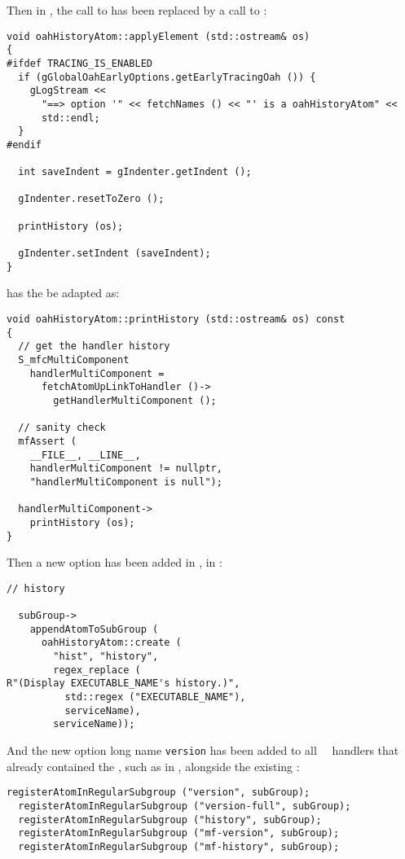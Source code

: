Then in , the call to  has been replaced by a call to :
\begin{lstlisting}[language=CPlusPlus]
void oahHistoryAtom::applyElement (std::ostream& os)
{
#ifdef TRACING_IS_ENABLED
  if (gGlobalOahEarlyOptions.getEarlyTracingOah ()) {
    gLogStream <<
      "==> option '" << fetchNames () << "' is a oahHistoryAtom" <<
      std::endl;
  }
#endif

  int saveIndent = gIndenter.getIndent ();

  gIndenter.resetToZero ();

  printHistory (os);

  gIndenter.setIndent (saveIndent);
}
\end{lstlisting}

\method{}{} has the be adapted as:
\begin{lstlisting}[language=CPlusPlus]
void oahHistoryAtom::printHistory (std::ostream& os) const
{
  // get the handler history
  S_mfcMultiComponent
    handlerMultiComponent =
      fetchAtomUpLinkToHandler ()->
        getHandlerMultiComponent ();

  // sanity check
  mfAssert (
    __FILE__, __LINE__,
    handlerMultiComponent != nullptr,
    "handlerMultiComponent is null");

  handlerMultiComponent->
    printHistory (os);
}
\end{lstlisting}

Then a new option has been added in , in :
\begin{lstlisting}[language=CPlusPlus]
  // history

  subGroup->
    appendAtomToSubGroup (
      oahHistoryAtom::create (
        "hist", "history",
        regex_replace (
R"(Display EXECUTABLE_NAME's history.)",
          std::regex ("EXECUTABLE_NAME"),
          serviceName),
        serviceName));
\end{lstlisting}

And the new option long name {\tt version} has been added to all \regular\ \oahRepr\ handlers that already contained the , such as in , alongside the existing :
\begin{lstlisting}[language=CPlusPlus]
  registerAtomInRegularSubgroup ("version", subGroup);
  registerAtomInRegularSubgroup ("version-full", subGroup);
  registerAtomInRegularSubgroup ("history", subGroup);
  registerAtomInRegularSubgroup ("mf-version", subGroup);
  registerAtomInRegularSubgroup ("mf-history", subGroup);
\end{lstlisting}


